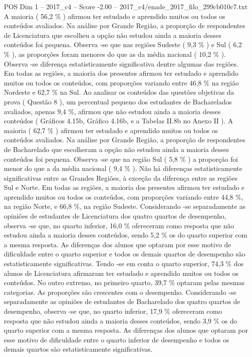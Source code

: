 \begin{textsample}{POS Dim 1 – 2017\_c4 – Score -2.00 – 2017\_c4/enade\_2017\_filo\_299cb010c7.txt}
A maioria ( 56,2 \% ) afirmou ter estudado e aprendido muitos ou todos os conteúdos avaliados.
Na análise por Grande Região, a proporção de respondentes de Licenciatura que escolheu a opção não estudou ainda a maioria desses conteúdos foi pequena.
Observa -se que nas regiões Sudeste ( 9,3 \% ) e Sul ( 6,2 \% ), as proporções foram menores do que as da média nacional ( 10,2 \% ).
Observa -se diferença estatisticamente significativa dentre algumas das regiões.
Em todas as regiões, a maioria dos presentes afirmou ter estudado e aprendido muitos ou todos os conteúdos, com proporções variando entre 46,8 \% na região Nordeste e 62,7 \% na Sul.
Ao analisar os conteúdos das questões objetivas da prova ( Questão 8 ), um percentual pequeno dos estudantes de Bacharelados avaliados, apenas 9,4 \%, afirmou que não estudou ainda a maioria desses conteúdos ( Gráficos 4.15b, Gráfico 4.16b, e a Tabelas II.8b no Anexo II ).
A maioria ( 62,7 \% ) afirmou ter estudado e aprendido muitos ou todos os conteúdos avaliados.
Na análise por Grande Região, a proporção de respondentes de Bacharelado que escolheram a opção não estudou ainda a maioria desses conteúdos foi pequena.
Observa -se que na região Sul ( 5,8 \% ) a proporção foi menor do que a da média nacional ( 9,4 \% ).
Não há diferenças estatisticamente significativas entre as Grandes Regiões, à exceção da diferença entre as regiões Sul e Norte.
Em todas as regiões, a maioria dos presentes afirmou ter estudado e aprendido muitos ou todos os conteúdos, com proporções variando entre 44,8 \%, na região Norte, e 66,8 \%, na região Sudeste.
Considerando -se separadamente as opiniões de estudantes de Licenciatura dos quatro quartos de desempenho, observa -se que, no quarto inferior, 16,0 \% ofereceram como resposta que não estudou ainda a maioria desses conteúdos, sendo 5,2 \% os do quarto superior com a mesma resposta.
As diferenças dos alunos que optaram por esse motivo de dificuldade entre o quarto superior e todos os demais quartos de desempenho são estatisticamente significativas.
Tendo -se em conta o quarto superior, 74,3 \% dos alunos de Licenciatura afirmaram ter estudado e aprendido muitos ou todos os conteúdos.
No outro extremo, no primeiro quarto, 39,7 \% optaram pelas mesmas categorias.
As proporções são crescentes com o desempenho.
Considerando -se separadamente as opiniões de estudantes de Bacharelado dos quatro quartos de desempenho, observa -se que, no quarto inferior, 17,9 \% ofereceram como resposta que não estudou ainda a maioria desses conteúdos, sendo 3,9 \% os do quarto superior com a mesma resposta.
As diferenças dos alunos que optaram por esse motivo de dificuldade entre o quarto inferior de desempenho e todos os demais quartos são estatisticamente significativas.

\end{textsample}
